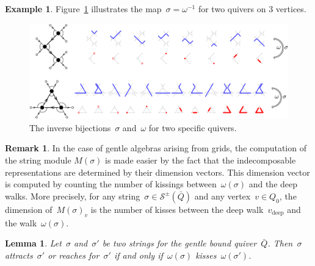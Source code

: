 \documentclass{amsart}
\newtheorem{lemma}[theorem]{Lemma}
\theoremstyle{definition}
\newtheorem{example}[theorem]{Example}
\newtheorem{remark}[theorem]{Remark}
\newcommand{\fref}[1]{Figure~\ref{#1}} %
\newcommand{\strings}{\mathcal{S}} %
\newcommand{\deep}{\mathrm{deep}} %
\begin{document}
\begin{example}
\label{exm:exmBijectionStringsWalks1}
\fref{fig:exmBijectionStringsWalks1} illustrates the map~$\sigma = \omega^{-1}$ for two quivers on $3$ vertices.

\begin{figure}[t]
	\capstart
	\centerline{\includegraphics[scale=.4]{exmBijectionStringsWalks1}}
	\caption{The inverse bijections~$\sigma$ and~$\omega$ for two specific quivers.}
	\label{fig:exmBijectionStringsWalks1}
\end{figure}
\end{example}


\begin{remark}
In the case of gentle algebras arising from grids, the computation of the string module $M(\sigma)$ is made easier by the fact that the indecomposable representations are determined by their dimension vectors.
This dimension vector is computed by counting the number of kissings between~$\omega(\sigma)$ and the deep walks.
More precisely, for any string~$\sigma \in \strings^\pm(\bar Q)$ and any vertex~$v \in Q_0$, the dimension of~$M(\sigma)_v$ is the number of kisses between the deep walk~$v_\deep$ and the walk~$\omega(\sigma)$.
\end{remark}


\begin{lemma}\label{lem:attractDanceKiss}
Let~$\sigma$ and~$\sigma'$ be two strings for the gentle bound quiver~$\bar Q$.
Then~$\sigma$ attracts~$\sigma'$ or reaches for~$\sigma'$ if and only if~$\omega(\sigma)$ kisses~$\omega(\sigma')$.
\end{lemma}
\end{document}
